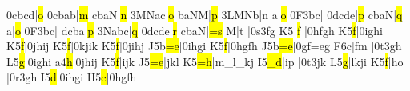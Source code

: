 \Alaligne\notes\qqb0cbcd|\hl o\enotes
\temps\notes\qqb0cbab|\hl m\enotes
\barre\notes{}cbaN|\hl n\enotes
\temps\notes\qqb3MNac|\hl o\enotes
\barre\notes{}baNM|\hl p\enotes
\temps\notes\qqb3LMNb|\hu n\enotes
\barre\notes{}\ql a\sk|\hl o\enotes
\temps\notes\Ilegl0F\dqb3bc|\enotes
\temps\notes\qqb0dcde|\hl p\enotes
%
\def\atnextline{\def\interfacteur{12}}%
\Alaligne\noteskipLARGE\nspace\notes{}cbaN|\hl q\enotes
\temps\notes{}\ql a\sk|\hl o\enotes
\temps\notes\Ilegl0F\dqb3bc|\enotes
\barre\notes{}dcba|\hl p\enotes
\temps\notes\qqb3Nabc|\hl q\enotes
\barre\notes\qqb0dcde|\hl r\enotes
\temps\notes\soufflcr{}cbaN|\hl{=s}\enotes
\barre\nspace\notes{}\ql M|\ql t\cbreath\enotes
\Zalapage\noteskipLarge\notes{}\soupir|\Ilegu0s\dsoqb3fg\enotes
\temps\arpg K5\relax
\notes {}\hl f\relax
   |\qsoqb0hfgh\enotes
\barre\arpg K5\notes{}\hl f|\qsoqb0ighi\enotes
\temps\arpg K5\notes{}\hl f|\qsoqb0jhij\enotes
\barre\arpg K5\notes{}\hl f|\qsoqb0kjik\enotes
\temps\arpg K5\notes{}\hl f|\qsoqb0jihj\enotes
\barre\Arpg J5\notes{}\lh b\hl{=e}|\qsoqb0ihgi\enotes
\temps\arpg K5\notes{}\hl f|\qsoqb0hgfh\enotes
\Alaligne\Arpg J5\notes{}\lh b\hl{=e}|\qsoqb0gf{=e}g\enotes
\temps\arpg F6\notes{}\ql c|\zq f\ql m\sk\enotes
\notes\soupir|\Ilegu0t\dsoqb3gh\enotes
\barre\Arpg L5\notes{}\hl g|\qsoqb0ighi\enotes
\temps\arpg a4\notes{}\hl h|\qsoqb0jhij\enotes
\barre\Arpg K5\notes{}\hl f|ijk\enotes
\temps\Arpg J5\notes{}\hl{=e}|jkl\enotes
\barre\Arpg K5\notes{}\hl{=h}|m{_l}{_k}j\enotes
\temps\Arpg I5\notes{}\hl{_d}\sk|\zq i\ql p\enotes
\temps\notes|\Ilegu0t\dsoqb3jk\enotes
\def\atnextline{\advancebottom{\Interligne}}\relax
\Alaligne\Arpg L5\notes{}\hl g|lkji\enotes
\temps\arpg K5\notes{}\hl f\sk|\zq h\ql o\enotes
\temps\notes|\Ilegu0r\dsoqb3gh\enotes
\barre\arpg I5\notes{}\hl d|\qsoqb0ihgi\enotes
\temps\arpg H5\notes{}\hl c|\qsoqb0hgfh\enotes

